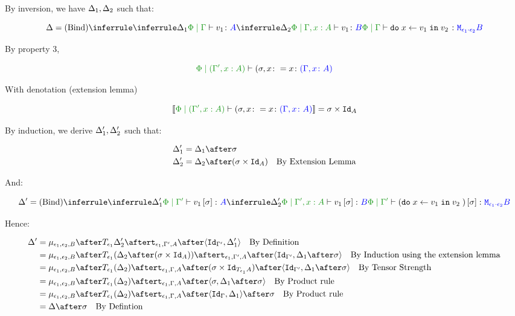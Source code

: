 \documentclass{report}
\begin{document}
By inversion, we have $\Delta_1, \Delta_2$ such that:

\begin{equation}
    \D = \ntreeruleII{Bind}{
        \treeruleI{\D_1}{\etyperelation{\P}{\G}{v_1}{A}}
        }{
        \treeruleI{\D_2}{\etyperelation{\P}{\G, x:A }{v_1}{B}}
    }{
        \etyperelation{\P}{\G}{\doin{x}{v_1}{v_2}}{\M{\e_1\dot\e_2}{B}}
    }
\end{equation}

By property 3,

\begin{equation}
    \etyperelation{\P}{(\G', x:A)}{(\si, x\setto x}{(\gax)}
\end{equation}

With denotation (extension lemma)

\begin{equation}
    \deno{\etyperelation{\P}{(\G', x:A)}{(\si, x\setto x}{(\gax)}} = \si\times\Id{A}
\end{equation}

By induction, we derive $\Delta_1', \Delta_2'$ such that:

\begin{align*}
    \D_1' & = \D_1\after \si\\
    \D_2' & = \D_2\after (\si\times\Id{A})\qt{By Extension Lemma}
\end{align*}

And:

\begin{equation}
    \D' = \ntreeruleII{Bind}{
        \treeruleI{\D_1'}{\etyperelation{\P}{\G'}{v_1\ssi}{A}}
        }{
        \treeruleI{\D_2'}{\etyperelation{\P}{\G', x:A }{v_1\ssi}{B}}
    }{
        \etyperelation{\P}{\G'}{(\doin{x}{v_1}{v_2})\ssi}{\M{\e_1\dot\e_2}{B}}
    }
\end{equation}

Hence:

\begin{align*}
    \D' & = \bind{\e_1}{\e_2}{B}\after\T{\e_1}{\D_2'}\after\tstrength{\e_1}{\G'}{A}\after\pr{\Id{\G'}}{\D_1'}\qt{By Definition}\\
    & = \bind{\e_1}{\e_2}{B}\after\T{\e_1}{(\D_2\after(\si\times\Id{A}))}\after\tstrength{\e_1}{\G'}{A}\after\pr{\Id{\G'}}{\D_1\after\si}\qt{By Induction using the extension lemma}\\
    & = \bind{\e_1}{\e_2}{B}\after\T{\e_1}{(\D_2)}\after\tstrength{\e_1}{\G}{A}\after(\si\times\Id{\T{\e_1}{A}})\after\pr{\Id{\G'}}{\D_1\after\si}\qt{By Tensor Strength}\\
    & = \bind{\e_1}{\e_2}{B}\after\T{\e_1}{(\D_2)}\after\tstrength{\e_1}{\G}{A}\after\pr{\si}{\D_1\after\si}\qt{By Product rule}\\
    & = \bind{\e_1}{\e_2}{B}\after\T{\e_1}{(\D_2)}\after\tstrength{\e_1}{\G}{A}\after\pr{\idg}{\D_1}\after\si\qt{By Product rule}\\
    &= \D\after\si\qt{By Defintion}\\
\end{align*}
\end{document}
